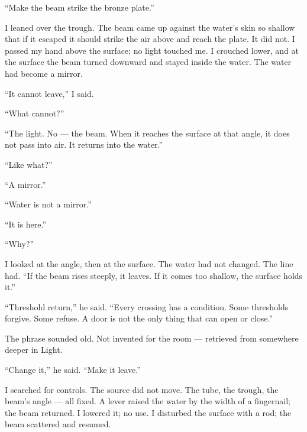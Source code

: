 ``Make the beam strike the bronze plate.''\par

I leaned over the trough. The beam came up against the water's skin so shallow that if it escaped it should strike the air above and reach the plate. It did not. I passed my hand above the surface; no light touched me. I crouched lower, and at the surface the beam turned downward and stayed inside the water. The water had become a mirror.\par

``It cannot leave,'' I said.\par

``What cannot?''\par

``The light. No --- the beam. When it reaches the surface at that angle, it does not pass into air. It returns into the water.''\par

``Like what?''\par

``A mirror.''\par

``Water is not a mirror.''\par

``It is here.''\par

``Why?''\par

I looked at the angle, then at the surface. The water had not changed. The line had. ``If the beam rises steeply, it leaves. If it comes too shallow, the surface holds it.''\par

``Threshold return,'' he said. ``Every crossing has a condition. Some thresholds forgive. Some refuse. A door is not the only thing that can open or close.''\par

The phrase sounded old. Not invented for the room --- retrieved from somewhere deeper in Light.\par

``Change it,'' he said. ``Make it leave.''\par

I searched for controls. The source did not move. The tube, the trough, the beam's angle --- all fixed. A lever raised the water by the width of a fingernail; the beam returned. I lowered it; no use. I disturbed the surface with a rod; the beam scattered and resumed.\par


